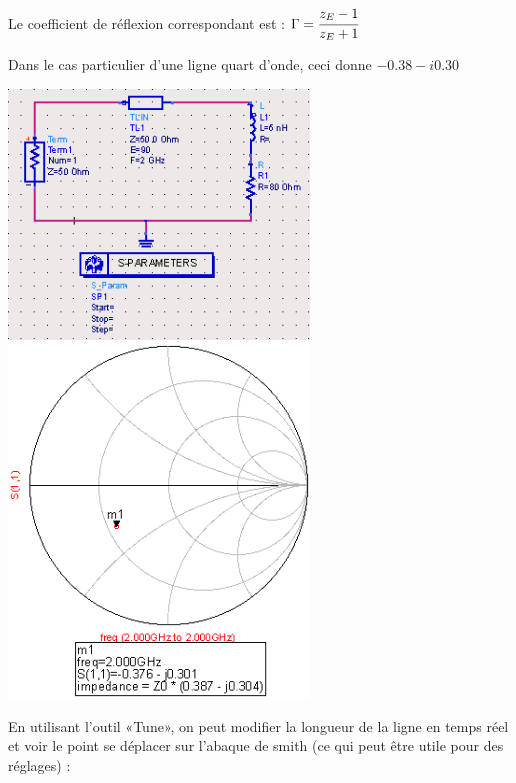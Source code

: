 \documentclass[10pt]{article}
\begin{document}
   Le coefficient de réflexion correspondant est : $\Gamma=\cfrac{z_E-1}{z_E+1}$

   Dans le cas particulier d’une ligne quart d’onde, ceci donne $-0.38-i0.30$

   \includegraphics[width=8cm]{I2_b_circuit.PNG}
   \includegraphics[width=8cm]{I2_b_smith.PNG}

   En utilisant l’outil «Tune», on peut modifier la longueur de la ligne en temps réel et voir le point se déplacer sur l’abaque de smith (ce qui peut être utile pour des réglages) :
\end{document}
